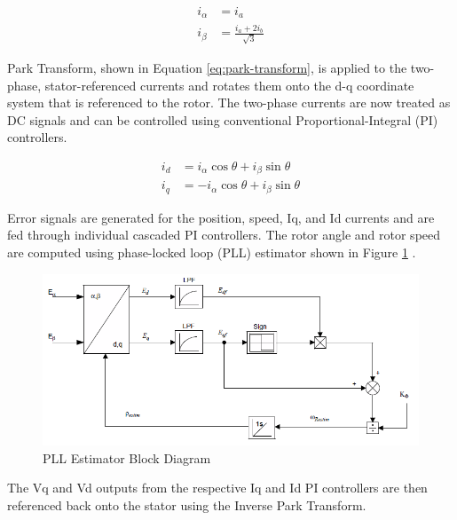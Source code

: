 \documentclass[english]{upeeei}
\begin{document}
\begin{equation} \label{eq:clark-transform}
    \begin{split}
        i_\alpha &= i_a \\
        i_\beta &= \frac{i_a + 2 i_b}{\sqrt{3}}
    \end{split}
\end{equation}

Park Transform, shown in Equation \ref{eq:park-transform}, is applied to the two-phase, stator-referenced currents and rotates them onto the d-q coordinate system that is referenced to the rotor. The two-phase currents are now treated as DC signals and can be controlled using conventional Proportional-Integral (PI) controllers. 

\begin{equation} \label{eq:park-transform}
    \begin{split}
        i_d &= i_\alpha \cos \theta + i_\beta \sin \theta \\
        i_q &= -i_\alpha \cos \theta + i_\beta \sin \theta 
    \end{split}
\end{equation}

Error signals are generated for the position, speed, Iq, and Id currents and are fed through individual cascaded PI controllers. The rotor angle and rotor speed are computed using phase-locked loop (PLL) estimator shown in Figure \ref{fig:pll-estimator} \cite{an1292}. 

\begin{figure}[H]
\begin{centering}
\includegraphics[width=1.0\columnwidth]{images/pll_estimator}
\par\end{centering}
\caption{PLL Estimator Block Diagram\label{fig:pll-estimator}}
\end{figure}

The Vq and Vd outputs from the respective Iq and Id PI controllers are then referenced back onto the stator using the Inverse Park Transform. 
\end{document}
